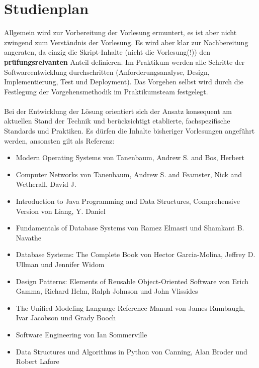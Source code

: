 \section{Studienplan}
Allgemein wird zur Vorbereitung der Vorlesung ermuntert, es ist aber nicht zwingend zum Verständnis der Vorlesung. Es wird aber klar zur Nachbereitung angeraten, da einzig die Skript-Inhalte (nicht die Vorlesung(!)) den \textbf{prüfungsrelvanten} Anteil definieren. Im Praktikum werden alle Schritte der Softwareentwicklung durchschritten (Anforderungsanalyse, Design, Implementierung, Test und Deployment). Das Vorgehen selbst wird durch die Festlegung der Vorgehensmethodik im Praktikumsteam festgelegt.
\\\\
Bei der Entwicklung der Lösung orientiert sich der Ansatz konsequent am aktuellen Stand der Technik und berücksichtigt etablierte, fachspezifische Standards und Praktiken. Es dürfen die Inhalte bisheriger Vorlesungen angeführt werden, ansonsten gilt als Referenz:

\begin{itemize}
\item Modern Operating Systems von Tanenbaum, Andrew S. and Bos, Herbert \cite{tanenbaum2022modern}
\item Computer Networks von Tanenbaum, Andrew S. and Feamster, Nick and Wetherall, David J. \cite{tanenbaum2021computer}
\item Introduction to Java Programming and Data Structures, Comprehensive Version von Liang, Y. Daniel \cite{liang2021java}
\item Fundamentals of Database Systems von Ramez Elmasri und Shamkant B. Navathe \cite{elmasri_navathe_2021}
\item Database Systems: The Complete Book von  Hector Garcia-Molina, Jeffrey D. Ullman und Jennifer Widom \cite{garcia_molina_ullman_widom_2011}
\item Design Patterns: Elements of Reusable Object-Oriented Software von  Erich Gamma, Richard Helm, Ralph Johnson und John Vlissides \cite{gamma1994design}
\item The Unified Modeling Language Reference Manual  von James Rumbaugh, Ivar Jacobson und Grady Booch \cite{rumbaugh_jacobson_booch_2004}
\item Software Engineering von  Ian Sommerville \cite{sommerville2015software}
\item Data Structures und Algorithms in Python von Canning, Alan Broder und Robert Lafore \cite{canning_broder_lafore_2023}
\end{itemize}
 
